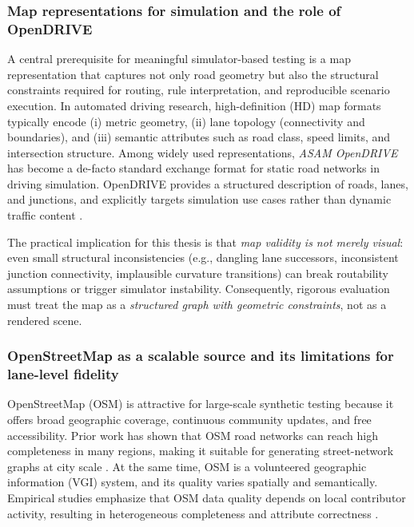 
\subsubsection{Map representations for simulation and the role of OpenDRIVE}
A central prerequisite for meaningful simulator-based testing is a map representation that captures not only road geometry but also the structural constraints required for routing, rule interpretation, and reproducible scenario execution. In automated driving research, high-definition (HD) map formats typically encode (i) metric geometry, (ii) lane topology (connectivity and boundaries), and (iii) semantic attributes such as road class, speed limits, and intersection structure. Among widely used representations, \textit{ASAM OpenDRIVE} has become a de-facto standard exchange format for static road networks in driving simulation. OpenDRIVE provides a structured description of roads, lanes, and junctions, and explicitly targets simulation use cases rather than dynamic traffic content \cite{asam_opendrive_170}.

The practical implication for this thesis is that \emph{map validity is not merely visual}: even small structural inconsistencies (e.g., dangling lane successors, inconsistent junction connectivity, implausible curvature transitions) can break routability assumptions or trigger simulator instability. Consequently, rigorous evaluation must treat the map as a \emph{structured graph with geometric constraints}, not as a rendered scene.

\subsubsection{OpenStreetMap as a scalable source and its limitations for lane-level fidelity}
OpenStreetMap (OSM) is attractive for large-scale synthetic testing because it offers broad geographic coverage, continuous community updates, and free accessibility. Prior work has shown that OSM road networks can reach high completeness in many regions, making it suitable for generating street-network graphs at city scale \cite{barringtonleigh2017osm}. At the same time, OSM is a volunteered geographic information (VGI) system, and its quality varies spatially and semantically. Empirical studies emphasize that OSM data quality depends on local contributor activity, resulting in heterogeneous completeness and attribute correctness \cite{haklay2010osm,barron2014osm}.

